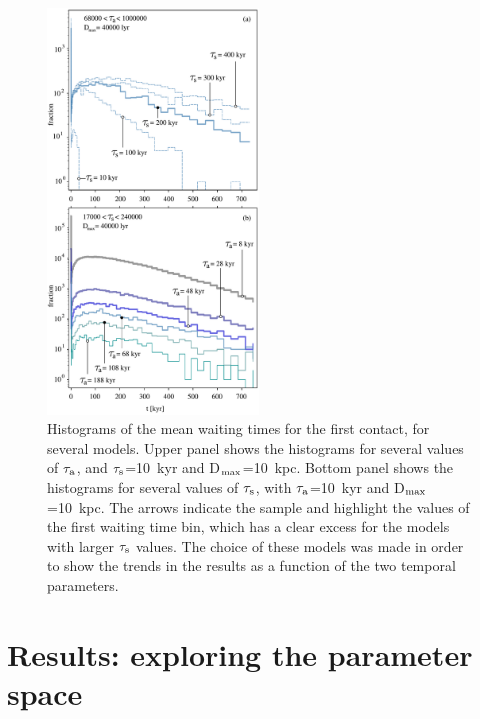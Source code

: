 \documentclass[crop]{CSLB}
\begin{document}
\begin{figure}
   \centering
   \includegraphics[width=0.5\textwidth]{F_waiting_for_1C.pdf}
   \caption{
   Histograms of the mean waiting times for the first contact, for
   several models.
   Upper panel shows the histograms for several values of $\tau_{\rm a}$, and
   $\tau_{\rm s}$=10~kyr and D$_{\rm max}$=10~kpc.
   Bottom panel shows the histograms for several values of $\tau_{\rm
   s}$, with $\tau_{\rm a}$=10~kyr and D$_{\rm max}$=10~kpc. The
   arrows indicate the sample and highlight the values of the first
   waiting time bin, which has a clear excess for the models with
   larger $\tau_{\rm s}$ values.
   The choice of these models was made in order to show the trends in
   the results as a function of the two temporal parameters.
   }
   \label{F_waiting_for_1C}
\end{figure}



\section{Results: exploring the parameter space}\label{S_results}
\end{document}

